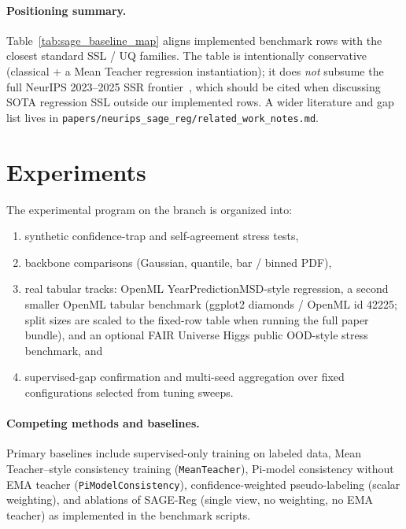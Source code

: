 \documentclass{article}
\begin{document}
\paragraph{Positioning summary.}
Table~\ref{tab:sage_baseline_map} aligns implemented benchmark rows with the
closest standard SSL / UQ families. The table is intentionally conservative
(classical + a Mean Teacher regression instantiation); it does \emph{not}
subsume the full NeurIPS 2023--2025 SSR frontier~\citep{dai2023semisupervised,huang2024rankup,sun2025heteroscedastic},
which should be cited when discussing SOTA regression SSL outside our
implemented rows. A wider literature and gap list lives in
\texttt{papers/neurips\_sage\_reg/related\_work\_notes.md}.

\section{Experiments}

The experimental program on the branch is organized into:
\begin{enumerate}
  \item synthetic confidence-trap and self-agreement stress tests,
  \item backbone comparisons (Gaussian, quantile, bar / binned PDF),
  \item real tabular tracks: OpenML YearPredictionMSD-style regression, a second
  smaller OpenML tabular benchmark (ggplot2 diamonds / OpenML id 42225; split sizes
  are scaled to the fixed-row table when running the full paper bundle), and an
  optional FAIR Universe Higgs public OOD-style stress benchmark, and
  \item supervised-gap confirmation and multi-seed aggregation over fixed
  configurations selected from tuning sweeps.
\end{enumerate}

\paragraph{Competing methods and baselines.}
Primary baselines include supervised-only training on labeled data,
Mean Teacher--style consistency training (\texttt{MeanTeacher}),
Pi-model consistency without EMA teacher (\texttt{PiModelConsistency}),
confidence-weighted pseudo-labeling (scalar weighting), and ablations of SAGE-Reg
(single view, no weighting, no EMA teacher) as implemented in the benchmark
scripts.
\end{document}
